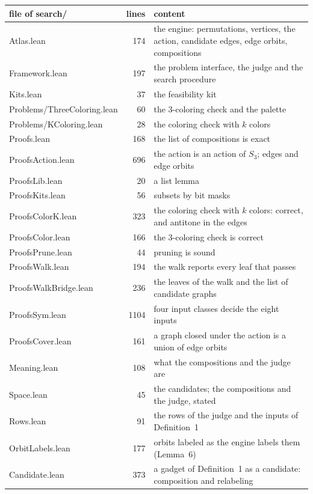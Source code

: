 \documentclass[11pt,a4paper]{article}
\newcommand{\leanus}{\textunderscore\allowbreak}
\newcommand{\lean}[1]{{\ttfamily\let\_\leanus #1}}
\begin{document}
\begin{center}
\begin{tabular}{@{}lrp{}@{}}
\toprule
file of \lean{search/} & lines & content\\
\midrule
\lean{Atlas.lean} & 174 & the engine: permutations, vertices, the action, candidate edges, edge orbits, compositions\\
\lean{Framework.lean} & 197 & the problem interface, the judge and the search procedure\\
\lean{Kits.lean} & 37 & the feasibility kit\\
\lean{Problems/ThreeColoring.lean} & 60 & the 3-coloring check and the palette\\
\lean{Problems/KColoring.lean} & 28 & the coloring check with $k$ colors\\
\lean{Proofs.lean} & 168 & the list of compositions is exact\\
\lean{ProofsAction.lean} & 696 & the action is an action of $S_3$; edges and edge orbits\\
\lean{ProofsLib.lean} & 20 & a list lemma\\
\lean{ProofsKits.lean} & 56 & subsets by bit masks\\
\lean{ProofsColorK.lean} & 323 & the coloring check with $k$ colors: correct, and antitone in the edges\\
\lean{ProofsColor.lean} & 166 & the 3-coloring check is correct\\
\lean{ProofsPrune.lean} & 44 & pruning is sound\\
\lean{ProofsWalk.lean} & 194 & the walk reports every leaf that passes\\
\lean{ProofsWalkBridge.lean} & 236 & the leaves of the walk and the list of candidate graphs\\
\lean{ProofsSym.lean} & 1104 & four input classes decide the eight inputs\\
\lean{ProofsCover.lean} & 161 & a graph closed under the action is a union of edge orbits\\
\lean{Meaning.lean} & 108 & what the compositions and the judge are\\
\lean{Space.lean} & 45 & the candidates; the compositions and the judge, stated\\
\lean{Rows.lean} & 91 & the rows of the judge and the inputs of Definition~1\\
\lean{OrbitLabels.lean} & 177 & orbits labeled as the engine labels them (Lemma~6)\\
\lean{Candidate.lean} & 373 & a gadget of Definition~1 as a candidate: composition and relabeling\\

\end{tabular}
\end{center}
\end{document}
